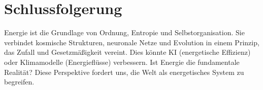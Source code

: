 \documentclass{article}
\begin{document}
	\section{Schlussfolgerung}
	Energie ist die Grundlage von Ordnung, Entropie und Selbstorganisation. Sie verbindet kosmische Strukturen, neuronale Netze und Evolution in einem Prinzip, das Zufall und Gesetzmäßigkeit vereint. Dies könnte KI (energetische Effizienz) oder Klimamodelle (Energieflüsse) verbessern. Ist Energie die fundamentale Realität? Diese Perspektive fordert uns, die Welt als energetisches System zu begreifen.
	
\end{document}
